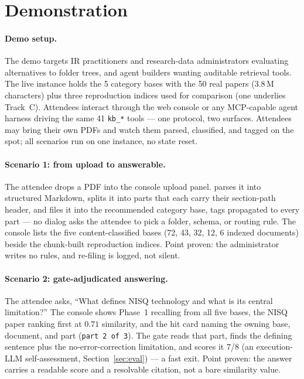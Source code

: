 
\section{Demonstration}
\label{sec:demo}

\paragraph{Demo setup.}
The demo targets IR practitioners and research-data administrators evaluating
alternatives to folder trees, and agent builders wanting auditable retrieval
tools. The live instance holds the 5
category bases with the 50 real papers
(3.8\,M characters) plus three reproduction indices used for comparison (one
underlies Track~C).
Attendees interact through the web console or any MCP-capable agent harness
driving the same 41 \texttt{kb\_*} tools --- one protocol, two surfaces. Attendees may bring their own PDFs and watch them parsed, classified,
and tagged on the spot; all scenarios run on one instance, no state reset.

\paragraph{Scenario 1: from upload to answerable.}
The attendee drops a PDF into the console upload panel. \sys{} parses it into
structured Markdown, splits it into parts that each carry their
section-path header, and files it into the recommended category base, tags
propagated to every part --- no dialog asks the attendee to pick a folder,
schema, or routing rule. The console lists the five
content-classified bases (72, 43, 32, 12, 6 indexed documents) beside the
chunk-built reproduction indices. Point
proven: the administrator writes no rules, and re-filing is logged, not
silent.

\paragraph{Scenario 2: gate-adjudicated answering.}
The attendee asks, ``What defines NISQ technology and what is its central
limitation?'' The console shows Phase~1 recalling from all five bases, the NISQ
paper ranking first at $0.71$ similarity, and
the hit card naming the owning base, document, and part (\texttt{part 2 of 3}).
The gate reads that part, finds the defining sentence plus the
no-error-correction limitation, and scores it 7/8 (an execution-LLM
self-assessment, Section~\ref{sec:eval}) --- a fast exit. Point
proven: the answer carries a readable score and a resolvable citation, not
a bare similarity value.

